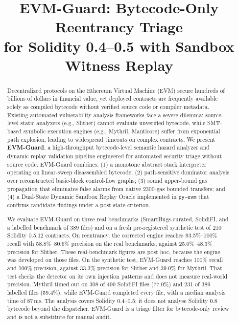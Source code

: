 \documentclass[conference]{IEEEtran}
\begin{document}
\title{\huge EVM-Guard: Bytecode-Only Reentrancy Triage\\for Solidity 0.4--0.5 with Sandbox Witness Replay}

\author{
}

\maketitle

\begin{abstract}
Decentralized protocols on the Ethereum Virtual Machine (EVM) secure hundreds of billions of dollars in financial value, yet deployed contracts are frequently available solely as compiled bytecode without verified source code or compiler metadata. Existing automated vulnerability analysis frameworks face a severe dilemma: source-level static analyzers (e.g., Slither) cannot evaluate unverified bytecode, while SMT-based symbolic execution engines (e.g., Mythril, Manticore) suffer from exponential path explosion, leading to widespread timeouts on complex contracts. We present \textbf{EVM-Guard}, a high-throughput bytecode-level semantic hazard analyzer and dynamic replay validation pipeline engineered for automated security triage without source code. EVM-Guard combines: (1) a monotone abstract stack interpreter operating on linear-sweep disassembled bytecode; (2) path-sensitive dominator analysis over reconstructed basic-block control-flow graphs; (3) sound upper-bound gas propagation that eliminates false alarms from native $2300$-gas bounded transfers; and (4) a Dual-State Dynamic Sandbox Replay Oracle implemented in \texttt{py-evm} that confirms candidate findings under a post-state criterion. 

We evaluate EVM-Guard on three real benchmarks (SmartBugs-curated, SolidiFI, and a labelled benchmark of 389 files) and on a fresh pre-registered synthetic test of 210 Solidity 0.5.12 contracts. On reentrancy, the corrected engine reaches 93.5\%--100\% recall with 58.8\%--80.6\% precision on the real benchmarks, against 25.0\%--48.3\% precision for Slither. These real-benchmark figures are post hoc, because the engine was developed on those files. On the synthetic test, EVM-Guard reaches 100\% recall and 100\% precision, against 33.3\% precision for Slither and 39.0\% for Mythril. That test checks the detector on its own injection patterns and does not measure real-world precision. Mythril timed out on 308 of 400 SolidiFI files (77.0\%) and 231 of 389 labelled files (59.4\%), while EVM-Guard completed every file, with a median analysis time of 87\,ms. The analysis covers Solidity 0.4--0.5; it does not analyse Solidity 0.8 bytecode beyond the dispatcher. EVM-Guard is a triage filter for bytecode-only review and is not a substitute for manual audit.
\end{abstract}
\end{document}
